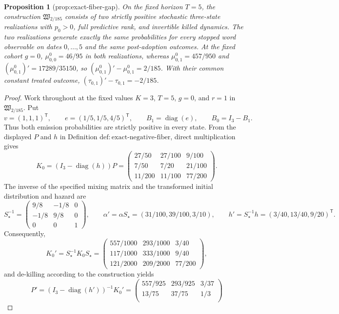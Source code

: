 \documentclass{article}
\newtheorem{proposition}{Proposition}
\begin{document}
\begin{proposition}[prop:exact-fiber-gap]\label{prop:exact-fiber-gap}
On the fixed horizon \(T=5\), the construction \(\mathfrak W_{2/185}\) consists of two strictly positive stochastic three-state realizations with \(p_0>0\), full predictive rank, and invertible killed dynamics. The two realizations generate exactly the same probabilities for every stopped word observable on dates \(0,\ldots,5\) and the same post-adoption outcomes. At the fixed cohort \(g=0\), \(\mu^0_{0,0}=46/95\) in both realizations, whereas \(\mu^0_{0,1}=457/950\) and \((\mu^0_{0,1})'=17289/35150\), so \((\mu^0_{0,1})'-\mu^0_{0,1}=2/185\). With their common constant treated outcome, \((\tau_{0,1})'-\tau_{0,1}=-2/185\).
\end{proposition}
\begin{proof}
Work throughout at the fixed values \(K=3\), \(T=5\), \(g=0\), and \(r=1\) in \(\mathfrak W_{2/185}\).  Put
\[
 v=(1,1,1)^{\mathsf T},\qquad
 e=(1/5,1/5,4/5)^{\mathsf T},\qquad
 B_1=\operatorname{diag}(e),\qquad B_0=I_3-B_1.
\]
Thus both emission probabilities are strictly positive in every state.  From the displayed \(P\) and \(h\) in Definition \(\mathrm{def{:}exact\text{-}negative\text{-}fiber}\), direct multiplication gives
\[
 K_0=(I_3-\operatorname{diag}(h))P
 =\begin{pmatrix}
 27/50&27/100&9/100\\
 7/50&7/20&21/100\\
 11/200&11/100&77/200
 \end{pmatrix}.
\]
The inverse of the specified mixing matrix and the transformed initial distribution and hazard are
\[
 S_{\star}^{-1}
 =\begin{pmatrix}9/8&-1/8&0\\-1/8&9/8&0\\0&0&1\end{pmatrix},
 \qquad
 \alpha'=\alpha S_{\star}=(31/100,39/100,3/10),
 \qquad
 h'=S_{\star}^{-1}h=(3/40,13/40,9/20)^{\mathsf T}.
\]
Consequently,
\[
 K_0'=S_{\star}^{-1}K_0S_{\star}
 =\begin{pmatrix}
 557/1000&293/1000&3/40\\
 117/1000&333/1000&9/40\\
 121/2000&209/2000&77/200
 \end{pmatrix},
\]
and de-killing according to the construction yields
\[
 P'=(I_3-\operatorname{diag}(h'))^{-1}K_0'
 =\begin{pmatrix}
 557/925&293/925&3/37\\
 13/75&37/75&1/3\\

\end{pmatrix}\]
\end{proof}
\end{document}
